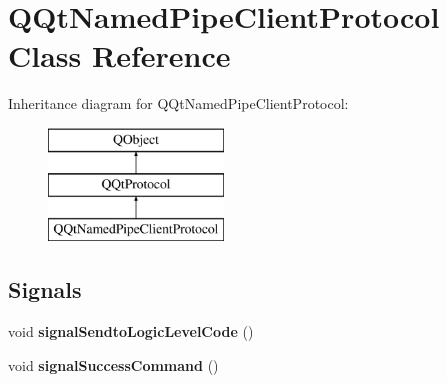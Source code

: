 \hypertarget{class_q_qt_named_pipe_client_protocol}{}\section{Q\+Qt\+Named\+Pipe\+Client\+Protocol Class Reference}
\label{class_q_qt_named_pipe_client_protocol}
Inheritance diagram for Q\+Qt\+Named\+Pipe\+Client\+Protocol\+:\begin{figure}[H]
\begin{center}
\leavevmode
\includegraphics[height=3.000000cm]{class_q_qt_named_pipe_client_protocol}
\end{center}
\end{figure}
\subsection*{Signals}
\begin{DoxyCompactItemize}
\item 
\mbox{\label{class_q_qt_named_pipe_client_protocol_a8aaf0cf596880523d0b81569562c6646}} 
void {\bfseries signal\+Sendto\+Logic\+Level\+Code} ()
\item 
\mbox{\label{class_q_qt_named_pipe_client_protocol_aff3c5ea0beb8bb0cc549021257e515a6}} 
void {\bfseries signal\+Success\+Command} ()
\end{DoxyCompactItemize}
